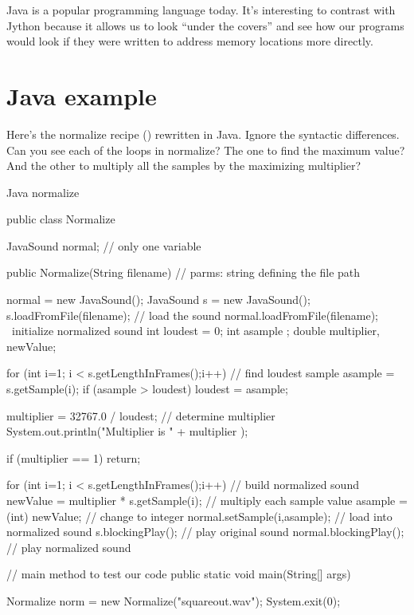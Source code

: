 

Java is a popular programming language today.  It's interesting to contrast with Jython because it allows us to look ``under the covers'' and see how our programs would look if they were written to address memory locations more directly.


\section{Java example}

	Here's the normalize recipe () rewritten in Java.  Ignore the syntactic differences.  Can you see each of the loops in normalize?  The one to find the maximum value?  And the other to multiply all the samples by the maximizing multiplier?

\begin{recipe}{Java normalize}
\begin{example}
public class Normalize {

    JavaSound normal;				// only one variable


    public Normalize(String filename) 		// parms: string defining the file path
    {				
	normal = new JavaSound();		
	JavaSound s = new JavaSound();
	s.loadFromFile(filename);		// load the sound
	normal.loadFromFile(filename);		\ initialize normalized sound
	int loudest = 0;
	int asample ;
	double multiplier, newValue;

	for (int i=1; i < s.getLengthInFrames();i++)    // find loudest sample
		{
		  asample = s.getSample(i);
	 	  if (asample > loudest) 
		     loudest = asample;
                }
		 

	multiplier = 32767.0 / loudest;    	// determine multiplier  
	System.out.println("Multiplier is " + multiplier ); 
		
	if (multiplier == 1)
		return;
	
	
	for (int i=1; i < s.getLengthInFrames();i++) 	// build normalized sound 
		{	
		  newValue = multiplier * s.getSample(i);  // multiply each sample value
		  asample =  (int) newValue;		   // change to integer
		  normal.setSample(i,asample);		   // load into normalized sound
		}
	s.blockingPlay();				   // play original sound
	normal.blockingPlay();			 	   // play normalized sound
	
	} 

	// main method to test our code 
    	public static void main(String[] args) {
	
	Normalize norm = new Normalize("squareout.wav");
         System.exit(0);
	
	}

}
\end{example}
\end{recipe}



